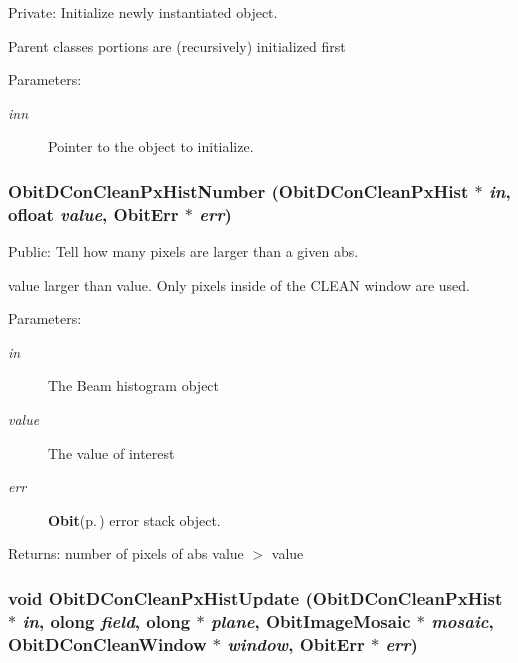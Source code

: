 Private: Initialize newly instantiated object. 

Parent classes portions are (recursively) initialized first \begin{Desc}
\item[Parameters:]
\begin{description}
\item[{\em inn}]Pointer to the object to initialize. \end{description}
\end{Desc}
\subsubsection{ Obit\-DCon\-Clean\-Px\-Hist\-Number ({\bf Obit\-DCon\-Clean\-Px\-Hist} $\ast$ {\em in}, {\bf ofloat} {\em value}, {\bf Obit\-Err} $\ast$ {\em err})}\label{ObitDConCleanPxHist_8c_a12}


Public: Tell how many pixels are larger than a given abs. 

value larger than value. Only pixels inside of the CLEAN window are used. \begin{Desc}
\item[Parameters:]
\begin{description}
\item[{\em in}]The Beam histogram object \item[{\em value}]The value of interest \item[{\em err}]{\bf Obit}{\rm (p.\,\pageref{structObit})} error stack object. \end{description}
\end{Desc}
\begin{Desc}
\item[Returns:]number of pixels of abs value $>$ value \end{Desc}
\subsubsection{\setlength{\rightskip}{0pt plus 5cm}void Obit\-DCon\-Clean\-Px\-Hist\-Update ({\bf Obit\-DCon\-Clean\-Px\-Hist} $\ast$ {\em in}, {\bf olong} {\em field}, {\bf olong} $\ast$ {\em plane}, {\bf Obit\-Image\-Mosaic} $\ast$ {\em mosaic}, {\bf Obit\-DCon\-Clean\-Window} $\ast$ {\em window}, {\bf Obit\-Err} $\ast$ {\em err})}\label{ObitDConCleanPxHist_8c_a11}


